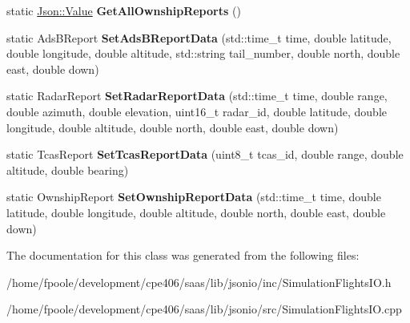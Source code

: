 \begin{DoxyCompactItemize}
\item 
\hypertarget{class_simulation_flights_i_o_ade0642e5b82e2f1dcdc9cfb37948930a}{}static \hyperlink{class_json_1_1_value}{Json\+::\+Value} {\bfseries Get\+All\+Ownship\+Reports} ()\label{class_simulation_flights_i_o_ade0642e5b82e2f1dcdc9cfb37948930a}

\item 
\hypertarget{class_simulation_flights_i_o_a8b2cbdb368354ef6d146c2ebff40b772}{}static Ads\+B\+Report {\bfseries Set\+Ads\+B\+Report\+Data} (std\+::time\+\_\+t time, double latitude, double longitude, double altitude, std\+::string tail\+\_\+number, double north, double east, double down)\label{class_simulation_flights_i_o_a8b2cbdb368354ef6d146c2ebff40b772}

\item 
\hypertarget{class_simulation_flights_i_o_aa5459f4e8844db69c79fa970c5ce52ee}{}static Radar\+Report {\bfseries Set\+Radar\+Report\+Data} (std\+::time\+\_\+t time, double range, double azimuth, double elevation, uint16\+\_\+t radar\+\_\+id, double latitude, double longitude, double altitude, double north, double east, double down)\label{class_simulation_flights_i_o_aa5459f4e8844db69c79fa970c5ce52ee}

\item 
\hypertarget{class_simulation_flights_i_o_abec6b482e52bb519f435714b6c738c45}{}static Tcas\+Report {\bfseries Set\+Tcas\+Report\+Data} (uint8\+\_\+t tcas\+\_\+id, double range, double altitude, double bearing)\label{class_simulation_flights_i_o_abec6b482e52bb519f435714b6c738c45}

\item 
\hypertarget{class_simulation_flights_i_o_a5c9753c35e366a5221066d9843270cc2}{}static Ownship\+Report {\bfseries Set\+Ownship\+Report\+Data} (std\+::time\+\_\+t time, double latitude, double longitude, double altitude, double north, double east, double down)\label{class_simulation_flights_i_o_a5c9753c35e366a5221066d9843270cc2}

\end{DoxyCompactItemize}


The documentation for this class was generated from the following files\+:\begin{DoxyCompactItemize}
\item 
/home/fpoole/development/cpe406/saas/lib/jsonio/inc/Simulation\+Flights\+I\+O.\+h\item 
/home/fpoole/development/cpe406/saas/lib/jsonio/src/Simulation\+Flights\+I\+O.\+cpp\end{DoxyCompactItemize}
